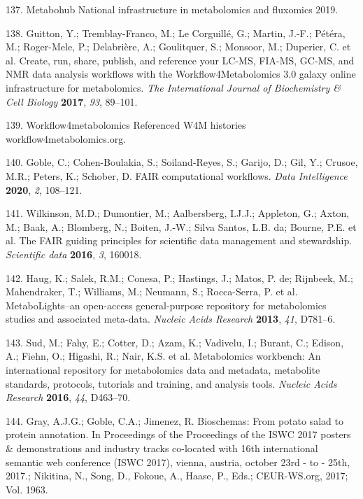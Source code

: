 \documentclass[]{article}
\begin{document}
\leavevmode\hypertarget{ref-metabohub_website_2019}{}%
137. Metabohub National infrastructure in metabolomics and fluxomics 2019.

\leavevmode\hypertarget{ref-guitton_2017}{}%
138. Guitton, Y.; Tremblay-Franco, M.; Le Corguillé, G.; Martin, J.-F.; Pétéra, M.; Roger-Mele, P.; Delabrière, A.; Goulitquer, S.; Monsoor, M.; Duperier, C. et al. Create, run, share, publish, and reference your LC-MS, FIA-MS, GC-MS, and NMR data analysis workflows with the Workflow4Metabolomics 3.0 galaxy online infrastructure for metabolomics. \emph{The International Journal of Biochemistry \& Cell Biology} \textbf{2017}, \emph{93}, 89--101.

\leavevmode\hypertarget{ref-workflow4metabolomics_website_nd}{}%
139. Workflow4metabolomics Referenced W4M histories workflow4metabolomics.org.

\leavevmode\hypertarget{ref-goble_2019}{}%
140. Goble, C.; Cohen-Boulakia, S.; Soiland-Reyes, S.; Garijo, D.; Gil, Y.; Crusoe, M.R.; Peters, K.; Schober, D. FAIR computational workflows. \emph{Data Intelligence} \textbf{2020}, \emph{2}, 108--121.

\leavevmode\hypertarget{ref-wilkinson_2016}{}%
141. Wilkinson, M.D.; Dumontier, M.; Aalbersberg, I.J.J.; Appleton, G.; Axton, M.; Baak, A.; Blomberg, N.; Boiten, J.-W.; Silva Santos, L.B. da; Bourne, P.E. et al. The FAIR guiding principles for scientific data management and stewardship. \emph{Scientific data} \textbf{2016}, \emph{3}, 160018.

\leavevmode\hypertarget{ref-haug_2013}{}%
142. Haug, K.; Salek, R.M.; Conesa, P.; Hastings, J.; Matos, P. de; Rijnbeek, M.; Mahendraker, T.; Williams, M.; Neumann, S.; Rocca-Serra, P. et al. MetaboLights--an open-access general-purpose repository for metabolomics studies and associated meta-data. \emph{Nucleic Acids Research} \textbf{2013}, \emph{41}, D781--6.

\leavevmode\hypertarget{ref-sud_2016}{}%
143. Sud, M.; Fahy, E.; Cotter, D.; Azam, K.; Vadivelu, I.; Burant, C.; Edison, A.; Fiehn, O.; Higashi, R.; Nair, K.S. et al. Metabolomics workbench: An international repository for metabolomics data and metadata, metabolite standards, protocols, tutorials and training, and analysis tools. \emph{Nucleic Acids Research} \textbf{2016}, \emph{44}, D463--70.

\leavevmode\hypertarget{ref-gray_2017}{}%
144. Gray, A.J.G.; Goble, C.A.; Jimenez, R. Bioschemas: From potato salad to protein annotation. In Proceedings of the Proceedings of the ISWC 2017 posters \& demonstrations and industry tracks co-located with 16th international semantic web conference (ISWC 2017), vienna, austria, october 23rd - to - 25th, 2017.; Nikitina, N., Song, D., Fokoue, A., Haase, P., Eds.; CEUR-WS.org, 2017; Vol. 1963.
\end{document}
